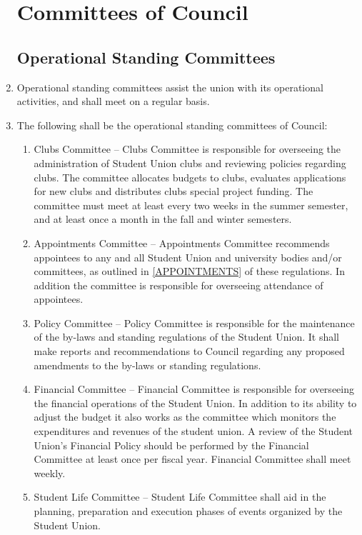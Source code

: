 \documentclass[oneside]{book}
\begin{document}
\begin{enumerate}
\chapter{\label{Committees_of_Council}Committees of Council }
\section{\label{Operational_Standing_Committees}Operational Standing Committees }
\item Operational standing committees assist the union with its operational activities, and shall meet on a regular basis.
\item The following shall be the operational standing committees of Council: 

\begin{enumerate}
\item Clubs Committee -- Clubs Committee is responsible for overseeing the 
administration of Student Union clubs and reviewing policies
regarding clubs. The committee allocates budgets to clubs, evaluates
applications for new clubs and distributes clubs special project funding. 
The committee must meet at least every two weeks in the summer semester, 
and at least once a month in the fall and winter semesters.
\item Appointments Committee -- Appointments Committee recommends appointees
to any and all Student Union and university bodies and/or committees, as outlined in 
\autoref{APPOINTMENTS} of these regulations. In addition the committee is responsible for overseeing 
attendance of appointees. 
\item Policy Committee -- Policy Committee is responsible for the maintenance
of the by-laws and standing regulations of the Student Union. It shall
make reports and recommendations to Council regarding any proposed
amendments to the by-laws or standing regulations. 
\item Financial Committee -- Financial Committee is responsible for overseeing
the financial operations of the Student Union. In addition to its
ability to adjust the budget it also works
as the committee which monitors the expenditures and revenues of the
student union. A review of the Student Union's Financial Policy should be performed
by the Financial Committee at least once per fiscal year. 
Financial Committee shall meet weekly.
\item Student Life Committee -- Student Life Committee shall aid in the planning, 
preparation and execution phases of events organized by the Student Union. 

\end{enumerate}
\end{enumerate}
\end{document}
